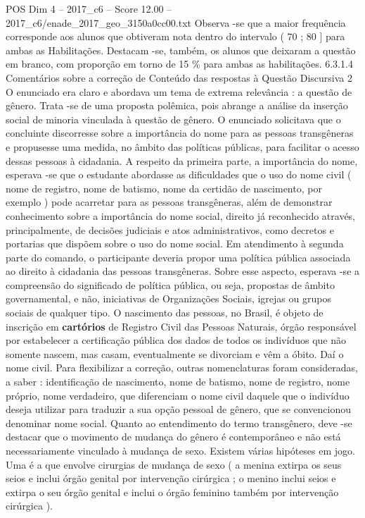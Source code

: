 \begin{textsample}{POS Dim 4 – 2017\_c6 – Score 12.00 – 2017\_c6/enade\_2017\_geo\_3150a0cc00.txt}
Observa -se que a maior frequência corresponde aos alunos que obtiveram nota dentro do intervalo ( 70 ; 80 ] para ambas as Habilitações.
Destacam -se, também, os alunos que deixaram a questão em branco, com proporção em torno de 15 \% para ambas as habilitações. 6.3.1.4 Comentários sobre a correção de Conteúdo das respostas à Questão Discursiva 2 O enunciado era claro e abordava um tema de extrema relevância : a questão de gênero.
Trata -se de uma proposta polêmica, pois abrange a análise da inserção social de minoria vinculada à questão de gênero.
O enunciado solicitava que o concluinte discorresse sobre a importância do nome para as pessoas transgêneras e propusesse uma medida, no âmbito das políticas públicas, para facilitar o acesso dessas pessoas à cidadania.
A respeito da primeira parte, a importância do nome, esperava -se que o estudante abordasse as dificuldades que o uso do nome civil ( nome de registro, nome de batismo, nome da certidão de nascimento, por exemplo ) pode acarretar para as pessoas transgêneras, além de demonstrar conhecimento sobre a importância do nome social, direito já reconhecido através, principalmente, de decisões judiciais e atos administrativos, como decretos e portarias que dispõem sobre o uso do nome social.
Em atendimento à segunda parte do comando, o participante deveria propor uma política pública associada ao direito à cidadania das pessoas transgêneras.
Sobre esse aspecto, esperava -se a compreensão do significado de política pública, ou seja, propostas de âmbito governamental, e não, iniciativas de Organizações Sociais, igrejas ou grupos sociais de qualquer tipo.
O nascimento das pessoas, no Brasil, é objeto de inscrição em \textbf{cartórios} de Registro Civil das Pessoas Naturais, órgão responsável por estabelecer a certificação pública dos dados de todos os indivíduos que não somente nascem, mas casam, eventualmente se divorciam e vêm a óbito.
Daí o nome civil.
Para flexibilizar a correção, outras nomenclaturas foram consideradas, a saber : identificação de nascimento, nome de batismo, nome de registro, nome próprio, nome verdadeiro, que diferenciam o nome civil daquele que o indivíduo deseja utilizar para traduzir a sua opção pessoal de gênero, que se convencionou denominar nome social.
Quanto ao entendimento do termo transgênero, deve -se destacar que o movimento de mudança do gênero é contemporâneo e não está necessariamente vinculado à mudança de sexo.
Existem várias hipóteses em jogo.
Uma é a que envolve cirurgias de mudança de sexo ( a menina extirpa os seus seios e inclui órgão genital por intervenção cirúrgica ; o menino inclui seios e extirpa o seu órgão genital e inclui o órgão feminino também por intervenção cirúrgica ).

\end{textsample}
